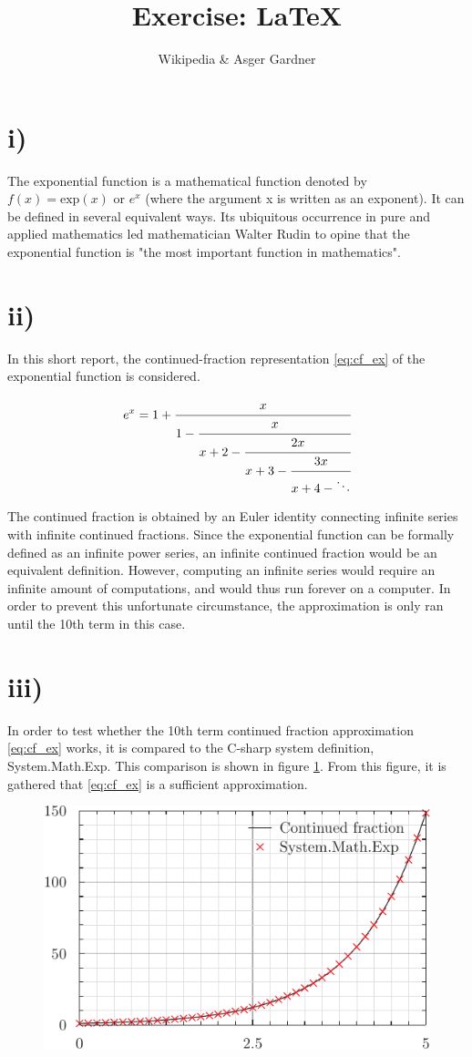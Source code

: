 \documentclass[12pt]{article}
\begin{document}
\title{Exercise: \LaTeX}
\author{Wikipedia \& Asger Gardner}

\maketitle

\section*{i)}

The exponential function is a mathematical function denoted by $f(x)=\text{exp}(x)$ or $e^{x}$ (where the argument x is written as an exponent). It can be defined in several equivalent ways. Its ubiquitous occurrence in pure and applied mathematics led mathematician Walter Rudin to opine that the exponential function is "the most important function in mathematics". 

\section*{ii)}

In this short report, the continued-fraction representation \eqref{eq:cf_ex} of the exponential function is considered.  

\begin{equation} \label{eq:cf_ex}
	e^x = 1 + \cfrac{x}{1 - \cfrac{x}{x + 2 - \cfrac{2x}{x + 3 - \cfrac{3x}{x + 4 - \ddots}}}}
\end{equation}

The continued fraction is obtained by an Euler identity connecting infinite series with infinite continued fractions. Since the exponential function can be formally defined as an infinite power series, an infinite continued fraction would be an equivalent definition. However, computing an infinite series would require an infinite amount of computations, and would thus run forever on a computer. In order to prevent this unfortunate circumstance, the approximation is only ran until the 10th term in this case.

\section*{iii)}

In order to test whether the 10th term continued fraction approximation \eqref{eq:cf_ex} works, it is compared to the C-sharp system definition, System.Math.Exp. This comparison is shown in figure \ref{fig:ex}. From this figure, it is gathered that \eqref{eq:cf_ex} is a sufficient approximation. 

\begin{figure}[H] \label{fig:ex}
	\includegraphics[width=\linewidth]{explot.pdf}
\end{figure}
\end{document}
